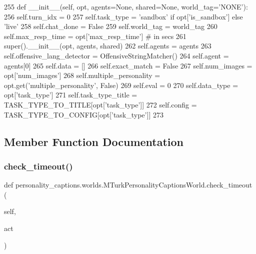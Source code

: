 \begin{DoxyCode}
255     \textcolor{keyword}{def }\_\_init\_\_(self, opt, agents=None, shared=None, world\_tag='NONE'):
256         self.turn\_idx = 0
257         self.task\_type = \textcolor{stringliteral}{'sandbox'} \textcolor{keywordflow}{if} opt[\textcolor{stringliteral}{'is\_sandbox'}] \textcolor{keywordflow}{else} \textcolor{stringliteral}{'live'}
258         self.chat\_done = \textcolor{keyword}{False}
259         self.world\_tag = world\_tag
260         self.max\_resp\_time = opt[\textcolor{stringliteral}{'max\_resp\_time'}]  \textcolor{comment}{# in secs}
261         super().\_\_init\_\_(opt, agents, shared)
262         self.agents = agents
263         self.offensive\_lang\_detector = OffensiveStringMatcher()
264         self.agent = agents[0]
265         self.data = []
266         self.exact\_match = \textcolor{keyword}{False}
267         self.num\_images = opt[\textcolor{stringliteral}{'num\_images'}]
268         self.multiple\_personality = opt.get(\textcolor{stringliteral}{'multiple\_personality'}, \textcolor{keyword}{False})
269         self.eval = 0
270         self.data\_type = opt[\textcolor{stringliteral}{'task\_type'}]
271         self.task\_type\_title = TASK\_TYPE\_TO\_TITLE[opt[\textcolor{stringliteral}{'task\_type'}]]
272         self.config = TASK\_TYPE\_TO\_CONFIG[opt[\textcolor{stringliteral}{'task\_type'}]]
273 
\end{DoxyCode}


\subsection{Member Function Documentation}
\mbox{\label{classpersonality__captions_1_1worlds_1_1MTurkPersonalityCaptionsWorld_a594560fccee92084ad833d131c77d860}} 
\subsubsection{\texorpdfstring{check\+\_\+timeout()}{check\_timeout()}}
{\footnotesize\ttfamily def personality\+\_\+captions.\+worlds.\+M\+Turk\+Personality\+Captions\+World.\+check\+\_\+timeout (\begin{DoxyParamCaption}\item[{}]{self,  }\item[{}]{act }\end{DoxyParamCaption})}




